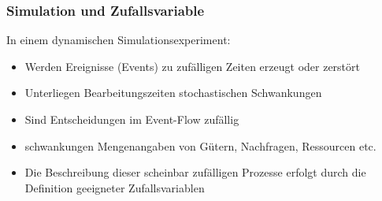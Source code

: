 \subsubsection{Simulation und Zufallsvariable}
In einem dynamischen Simulationsexperiment:
\begin{itemize}
\item Werden Ereignisse (Events) zu zufälligen Zeiten erzeugt oder zerstört
\item Unterliegen Bearbeitungszeiten stochastischen Schwankungen
\item Sind Entscheidungen im Event-Flow zufällig
\item schwankungen Mengenangaben von Gütern, Nachfragen, Ressourcen etc.
\item Die Beschreibung dieser scheinbar zufälligen Prozesse erfolgt durch die Definition geeigneter Zufallsvariablen
\end{itemize}
